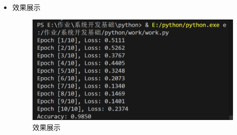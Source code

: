 \documentclass[UTF8]{ctexart}
\begin{document}
\begin{enumerate}
\begin{itemize}
\begin{verbatim}
  \end{verbatim}
\item 效果展示
  \begin{figure}[H]
    \centering
    \includegraphics[width=\textwidth]{338} %
    \caption{效果展示}
  \end{figure}
  \end{itemize}
\end{enumerate}













































\end{document}
